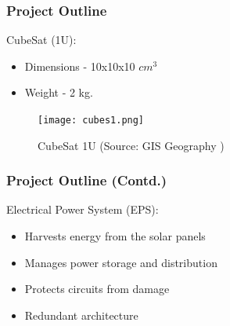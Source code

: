 \documentclass[aspectratio=169]{beamer}
\begin{document}
	\begin{frame}
		\frametitle{Project Outline	}
		
		\begin{minipage}{0.5\textwidth}
			CubeSat (1U):
			\begin{itemize}
				
				\item Dimensions - 10x10x10 $cm^{3} $
				\item Weight - 2 kg.
			\end{itemize}
		\end{minipage}
		\begin{minipage}{0.3\textwidth}
			\begin{figure}
				\texttt{[image: cubes1.png]}
				\begin{center}
					\caption{CubeSat 1U (Source: GIS Geography )}
				\end{center}
				\label{fig:trac2}
				
			\end{figure}
			
		\end{minipage}
		
	\end{frame}

	
	\begin{frame}
		\frametitle{Project Outline (Contd.)}
		Electrical Power System (EPS):
		\begin{itemize}
			
			\item Harvests energy from the solar panels
			\item Manages power storage and distribution
			\item Protects circuits from damage
			\item Redundant architecture
		\end{itemize}
	\end{frame}
	
	
\end{document}
